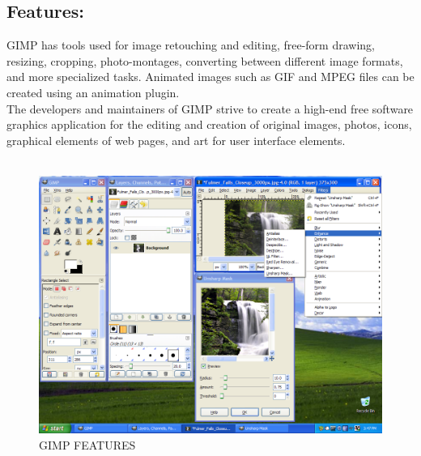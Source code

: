 \subsection{Features:}
GIMP has tools used for image retouching and editing, free-form drawing, resizing, cropping, photo-montages, converting between different image formats, and more specialized tasks. Animated images such as GIF and MPEG files can be created using an animation plugin.\\
The developers and maintainers of GIMP strive to create a high-end free software graphics application for the editing and creation of original images, photos, icons, graphical elements of web pages, and art for user interface elements.\\\\
\begin{figure} [h]
\centering
\includegraphics[scale=0.2]{images/feats.png}
\caption{GIMP FEATURES}
\end{figure}

